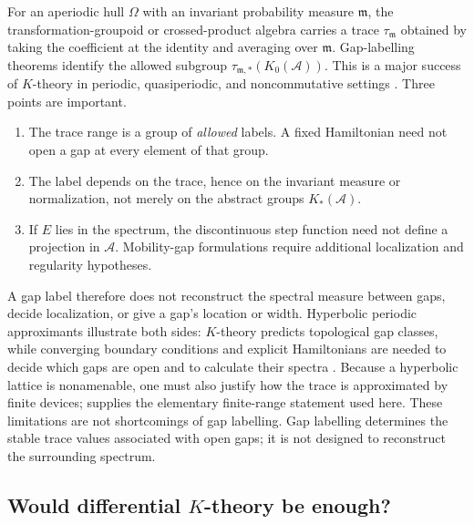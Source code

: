 \documentclass[11pt]{article}
\theoremstyle{definition}
\theoremstyle{remark}
\begin{document}
For an aperiodic hull \(\Omega\) with an invariant probability measure
\(\mathfrak m\), the transformation-groupoid or crossed-product algebra
carries a trace \(\tau_{\mathfrak m}\) obtained by taking the coefficient at
the identity and averaging over \(\mathfrak m\).  Gap-labelling theorems
identify the allowed subgroup
\(\tau_{\mathfrak m,*}(K_0(\mathcal A))\).  This is a major success of
\(K\)-theory in periodic, quasiperiodic, and noncommutative settings
\cite{BellissardBovierGhez,KellendonkPutnam}.  Three points are important.

\begin{enumerate}[label=\textup{(\roman*)},leftmargin=2.6em]
\item The trace range is a group of \emph{allowed} labels.  A fixed
  Hamiltonian need not open a gap at every element of that group.
\item The label depends on the trace, hence on the invariant measure or
  normalization, not merely on the abstract groups \(K_*(\mathcal A)\).
\item If \(E\) lies in the spectrum, the discontinuous step function need not
  define a projection in \(\mathcal A\).  Mobility-gap formulations require
  additional localization and regularity hypotheses.
\end{enumerate}

A gap label therefore does not reconstruct the spectral measure between
gaps, decide localization, or give a gap's location or width.  Hyperbolic
periodic approximants illustrate both sides: \(K\)-theory predicts
topological gap classes, while converging boundary conditions and explicit
Hamiltonians are needed to decide which gaps are open and to calculate their
spectra \cite{LuxProdan2023}.  Because a hyperbolic lattice is nonamenable,
one must also justify how the trace is approximated by finite devices;
 supplies the elementary finite-range
statement used here.  These limitations are not shortcomings of gap
labelling.  Gap labelling determines the stable trace values associated with
open gaps; it is not designed to reconstruct the surrounding spectrum.

\subsection{Would differential \texorpdfstring{\(K\)}{K}-theory be enough?}
\end{document}
